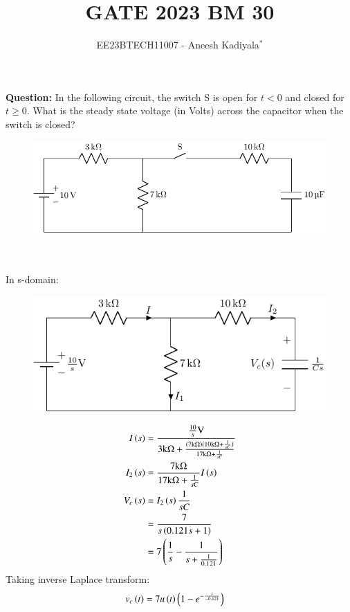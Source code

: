 \documentclass[journal,12pt,twocolumn]{IEEEtran}
\theoremstyle{remark}
\begin{document}

\vspace{3cm}

\title{GATE 2023 BM 30}
\author{EE23BTECH11007 - Aneesh Kadiyala$^{*}$%
}
\maketitle
\newpage
\bigskip

\renewcommand{\thefigure}{\theenumi}
\renewcommand{\thetable}{\theenumi}

\vspace{3cm}
\textbf{Question:} In the following circuit, the switch S is open for $t < 0$ and closed for $t \ge 0$.
What is the steady state voltage (in Volts) across the capacitor when the switch is closed?
\begin{figure}[h!]
    \centering
    \includegraphics[width = \columnwidth]{figs/c_fig1.pdf}
\end{figure}
\\
\solution
\\
In s-domain:
\begin{figure}[h!]
    \centering
    \includegraphics[width=\columnwidth]{figs/c_fig2.pdf}
\end{figure}
\begin{align}
I\left(s\right) &= \frac{\frac{10}{s}\text{V}}{3\text{k}\ohm + \frac{(7\text{k}\ohm)(10\text{k}\ohm + \frac{1}{sC})}{17\text{k}\ohm + \frac{1}{sC}}} \\
I_2\left(s\right) &= \frac{7\text{k}\ohm}{17\text{k}\ohm + \frac{1}{sC}}I\left(s\right) \\
V_c\left(s\right) &= I_2\left(s\right)\frac{1}{sC} \\
&= \frac{7}{s\left(0.121s + 1\right)} \\
&= 7\left(\frac{1}{s} - \frac{1}{s + \frac{1}{0.121}}\right)
\end{align}
Taking inverse Laplace transform:
\begin{align}
v_c\left(t\right) &= 7u\left(t\right)\left(1 - e^{-\frac{t}{-0.121}}\right)
\end{align}
\end{document}
